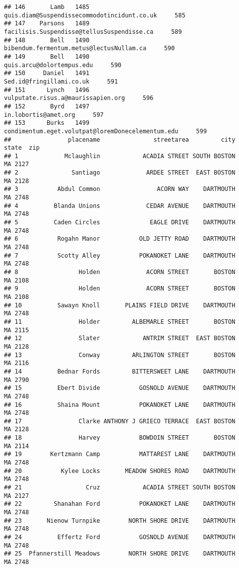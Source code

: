 \documentclass[
]{article}
\begin{document}
\begin{verbatim}
## 146       Lamb   1485       quis.diam@Suspendissecommodotincidunt.co.uk     585
## 147    Parsons   1489        facilisis.Suspendisse@tellusSuspendisse.ca     589
## 148       Bell   1490          bibendum.fermentum.metus@lectusNullam.ca     590
## 149       Bell   1490                         quis.arcu@dolortempus.edu     590
## 150     Daniel   1491                          Sed.id@fringillami.co.uk     591
## 151      Lynch   1496                vulputate.risus.a@maurissapien.org     596
## 152       Byrd   1497                              in.lobortis@amet.org     597
## 153      Burks   1499 condimentum.eget.volutpat@loremDonecelementum.edu     599
##                placename               streetarea         city state  zip
## 1             Mclaughlin            ACADIA STREET SOUTH BOSTON    MA 2127
## 2               Santiago             ARDEE STREET  EAST BOSTON    MA 2128
## 3           Abdul Common                ACORN WAY    DARTMOUTH    MA 2748
## 4          Blanda Unions             CEDAR AVENUE    DARTMOUTH    MA 2748
## 5          Caden Circles              EAGLE DRIVE    DARTMOUTH    MA 2748
## 6           Rogahn Manor           OLD JETTY ROAD    DARTMOUTH    MA 2748
## 7           Scotty Alley           POKANOKET LANE    DARTMOUTH    MA 2748
## 8                 Holden             ACORN STREET       BOSTON    MA 2108
## 9                 Holden             ACORN STREET       BOSTON    MA 2108
## 10          Sawayn Knoll       PLAINS FIELD DRIVE    DARTMOUTH    MA 2748
## 11                Holder         ALBEMARLE STREET       BOSTON    MA 2115
## 12                Slater            ANTRIM STREET  EAST BOSTON    MA 2128
## 13                Conway         ARLINGTON STREET       BOSTON    MA 2116
## 14          Bednar Fords         BITTERSWEET LANE    DARTMOUTH    MA 2790
## 15          Ebert Divide           GOSNOLD AVENUE    DARTMOUTH    MA 2748
## 16          Shaina Mount           POKANOKET LANE    DARTMOUTH    MA 2748
## 17                Clarke ANTHONY J GRIECO TERRACE  EAST BOSTON    MA 2128
## 18                Harvey           BOWDOIN STREET       BOSTON    MA 2114
## 19        Kertzmann Camp           MATTAREST LANE    DARTMOUTH    MA 2748
## 20           Kylee Locks       MEADOW SHORES ROAD    DARTMOUTH    MA 2748
## 21                  Cruz            ACADIA STREET SOUTH BOSTON    MA 2127
## 22         Shanahan Ford           POKANOKET LANE    DARTMOUTH    MA 2748
## 23       Nienow Turnpike        NORTH SHORE DRIVE    DARTMOUTH    MA 2748
## 24          Effertz Ford           GOSNOLD AVENUE    DARTMOUTH    MA 2748
## 25  Pfannerstill Meadows        NORTH SHORE DRIVE    DARTMOUTH    MA 2748

\end{verbatim}
\end{document}
